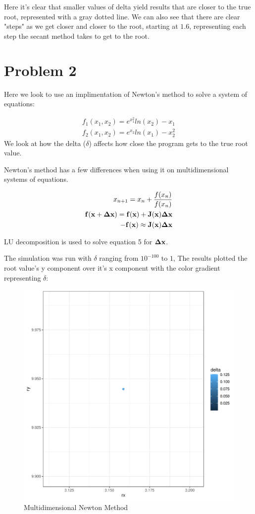 \documentclass[prb,twocolumn]{revtex4-2}
\begin{document}
Here it's clear that smaller values of delta yield results that are closer to the true root, represented with a gray dotted line. We can also see that there are clear "steps" as we get closer and closer to the root, starting at $1.6$, representing each step the secant method takes to get to the root.

\section{Problem 2}

Here we look to use an implimentation of Newton's method to solve a system of equations:

\begin{eqnarray}
f_1(x_1,x_2)=e^{x_1^2}ln(x_2)-x_1 \\
f_2(x_1,x_2)=e^{x_2}ln(x_1)-x_2^2
\label{namefornewequation}
\end{eqnarray}
We look at how the delta ($\delta$) affects how close the program gets to the true root value.

Newton's method has a few differences when using it on multidimensional systems of equations.

\begin{eqnarray}
x_{n+1}=x_n+\frac{f(x_n)}{f(x_n)} \\
\bold{f(x+\Delta x)}=\bold{f(x)}+\bold{J(x)\Delta x} \\
-\bold{f(x)}\approx\bold{J(x)\Delta x}
\label{namefornewequation}
\end{eqnarray}

LU decomposition is used to solve equation 5 for $\bold{\Delta x}$.


The simulation was run with $\delta$ ranging from $10^{-100}$ to $1$, The results plotted the root value's y component over it's x component with the color gradient representing $\delta$:

\begin{figure}[h!]
\centerline{\includegraphics [width=3 in] {newton}} \caption{Multidimensional Newton Method} \label{newton}
\end{figure}
\end{document}
